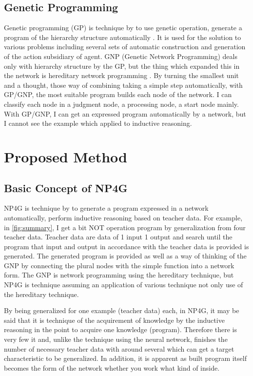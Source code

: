 \documentclass{article}
\begin{document}
\subsection {Genetic Programming}
Genetic programming (GP) is technique by to use genetic operation, generate a program of the hierarchy structure automatically \cite{Koza1994}.
It is used for the solution to various problems including several sets of automatic construction and generation of the action subsidiary of agent.
GNP (Genetic Network Programming) deals only with hierarchy structure by the GP, but the thing which expanded this in the network is hereditary network programming \cite{gnp}.
By turning the smallest unit and a thought, those way of combining taking a simple step automatically, with GP/GNP, the most suitable program builds each node of the network.
I can classify each node in a judgment node, a processing node, a start node mainly.
With GP/GNP, I can get an expressed program automatically by a network, but I cannot see the example which applied to inductive reasoning.

\section {Proposed Method}
\subsection{Basic Concept of NP4G}
NP4G is technique by to generate a program expressed in a network automatically, perform inductive reasoning based on teacher data.
For example, in \ref{fig:summary}, I get a bit NOT operation program by generalization from four teacher data.
Teacher data are data of 1 input 1 output and search until the program that input and output in accordance with the teacher data is provided is generated.
The generated program is provided as well as a way of thinking of the GNP by connecting the plural nodes with the simple function into a network form.
The GNP is network programming using the hereditary technique, but NP4G is technique assuming an application of various technique not only use of the hereditary technique.

By being generalized for one example (teacher data) each, in NP4G, it may be said that it is technique of the acquirement of knowledge by the inductive reasoning in the point to acquire one knowledge (program).
Therefore there is very few it and, unlike the technique using the neural network, finishes the number of necessary teacher data with around several which can get a target characteristic to be generalized.
In addition, it is apparent as built program itself becomes the form of the network whether you work what kind of inside.
\end{document}
